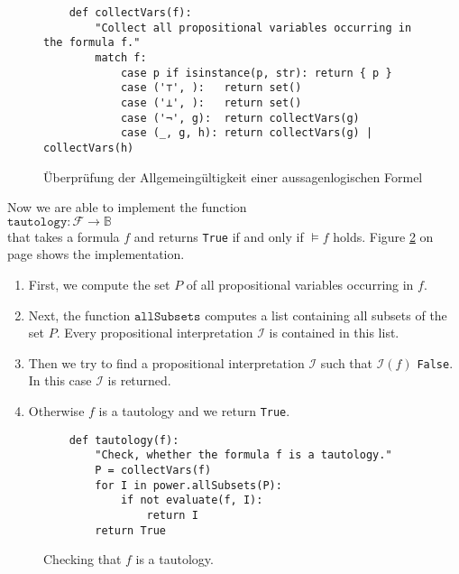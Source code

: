 \begin{figure}[!ht]
  \centering
\begin{verbatim}
    def collectVars(f):
        "Collect all propositional variables occurring in the formula f."
        match f:
            case p if isinstance(p, str): return { p }
            case ('⊤', ):   return set()
            case ('⊥', ):   return set()
            case ('¬', g):  return collectVars(g)
            case (_, g, h): return collectVars(g) | collectVars(h) 
\end{verbatim}
\vspace*{-0.3cm}
  \caption{Überprüfung der Allgemeingültigkeit einer aussagenlogischen Formel}
  \label{fig:tautology.py-collectVars}
\end{figure}

Now we are able to implement the function 
\\[0.2cm]
\hspace*{1.3cm}
$\mathtt{tautology}: \mathcal{F} \rightarrow \mathbb{B}$
\\[0.2cm]
that takes a formula $f$ and returns \texttt{True} if and only if $\models f$ holds.
Figure \ref{fig:tautology.py} on page \pageref{fig:tautology.py}
shows the implementation.
\begin{enumerate}
\item First, we compute the set $P$ of all propositional variables occurring in $f$.
\item Next, the function $\mathtt{allSubsets}$ computes a list containing all subsets of the set $P$.
      Every propositional interpretation  $\mathcal{I}$ is contained in this list.
\item Then we try to find a propositional interpretation $\mathcal{I}$ such that $\mathcal{I}(f)$
      \texttt{False}.  In this case $\mathcal{I}$ is returned. 
\item Otherwise $f$ is a tautology and we return \texttt{True}.
\end{enumerate}

\begin{figure}[!ht]
  \centering
\begin{verbatim}
    def tautology(f):
        "Check, whether the formula f is a tautology."
        P = collectVars(f)
        for I in power.allSubsets(P):
            if not evaluate(f, I):
                return I
        return True
\end{verbatim}
\vspace*{-0.3cm}
  \caption{Checking that $f$ is a tautology.}
  \label{fig:tautology.py}
\end{figure}


